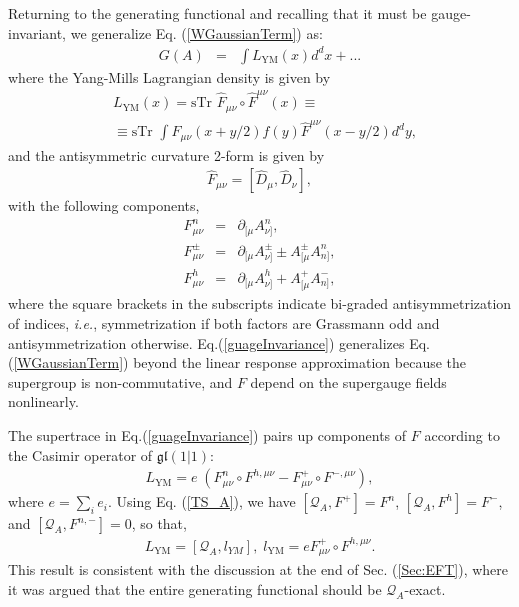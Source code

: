 \documentclass[final,5p,10pt,times,twocolumn,year]{elsarticle}
\begin{document}
Returning to the generating functional and recalling that it must be gauge-invariant, we generalize Eq. (\ref{WGaussianTerm}) as:
\begin{eqnarray}
    G(A) &=& \int L_\text{YM}(x)d^{d}x + ...
\end{eqnarray}
where the Yang-Mills Lagrangian density is given by
\begin{eqnarray}
    &L_\text{YM}(x) = \text{sTr }\hat F_{\mu\nu} \circ \hat F^{\mu\nu}(x)\equiv\nonumber \\
    &\equiv \text{sTr }\int \hat F_{\mu\nu} (x+y/2) f(y) \hat F^{\mu\nu}(x-y/2) d^{d}y,
    \label{guageInvariance}
\end{eqnarray}
and the antisymmetric curvature 2-form is given by
\begin{eqnarray}
    \hat{F}_{\mu\nu} = [\hat D_\mu, \hat D_\nu],
\end{eqnarray}
with the following components,
\begin{subequations}
\begin{eqnarray}
    F^n_{\mu\nu} &=& \partial_{[\mu}  A^n_{\nu]},\\
    F^{\pm}_{\mu\nu} &=& \partial_{[\mu}  A^\pm_{\nu]} \pm A^\pm_{[\mu} A^n_{n]},\\
    F^{h}_{\mu\nu} &=& \partial_{[\mu}  A^h_{\nu]} + A^+_{[\mu}  A^-_{n]},
\end{eqnarray}    
\end{subequations}
where the square brackets in the subscripts indicate bi-graded antisymmetrization of indices, \emph{i.e.}, symmetrization if both factors are Grassmann odd and antisymmetrization otherwise. Eq.(\ref{guageInvariance}) generalizes Eq.(\ref{WGaussianTerm}) beyond the linear response approximation because the supergroup is non-commutative, and $F$ depend on the supergauge fields nonlinearly.

The supertrace in Eq.(\ref{guageInvariance}) pairs up components of $F$ according to the Casimir operator of $\mathfrak{gl}(1|1)$:\cite{GL1_1WZ_2005}
\begin{eqnarray}
    L_\text{YM} = e\;({F}^n_{\mu\nu} \circ {F}^{h,\mu\nu} - {F}^+_{\mu\nu}\circ {F}^{-,\mu\nu}),\label{YMLagrangian}
\end{eqnarray}
where $e=\sum_i e_i$. Using Eq. (\ref{TS_A}), we have $[\mathcal{Q}_{A}, {F}^+] = {F}^n$, $[\mathcal{Q}_{A}, {F}^h] = {F}^-$, and $[\mathcal{Q}_{A}, {F}^{n,-}] = 0$, so that, 
\begin{eqnarray}
    L_\text{YM} = [\mathcal{Q}_{A}, l_{YM}],\; l_\text{YM} = e {F}^+_{\mu\nu} \circ {F}^{h,\mu\nu}.\label{QexactYM}
\end{eqnarray}
This result is consistent with the discussion at the end of Sec. (\ref{Sec:EFT}), where it was argued that the entire generating functional should be $\mathcal{Q}_{A}$-exact.
\end{document}
